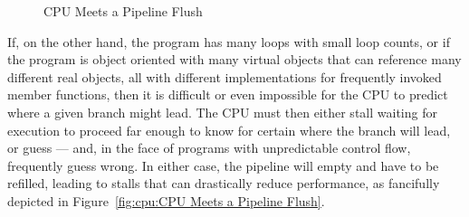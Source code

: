 \begin{figure}[htb]
\begin{center}
\end{center}
\caption{CPU Meets a Pipeline Flush}
\end{figure}

If, on the other hand, the program has many loops with small loop counts,
or if the program is object oriented with many virtual objects that
can reference many different real objects, all with different implementations
for frequently invoked member functions, then it is difficult or even
impossible for the CPU to predict where a given branch might lead.
The CPU must then either stall waiting for execution to proceed far enough
to know for certain where the branch will lead, or guess --- and, in the
face of programs with unpredictable control flow, frequently guess wrong.
In either case, the pipeline will empty and have to be refilled, leading
to stalls that can drastically reduce performance,
as fancifully depicted in Figure~\ref{fig:cpu:CPU Meets a Pipeline Flush}.

